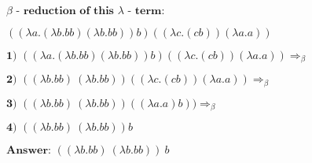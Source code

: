 \documentclass[a4paper,17pt]{extarticle}
\begin{document}
$\beta \textbf{ - reduction of this } \lambda \textbf{ - term:}$ \newline

$((\lambda a.(\lambda b.b b) (\lambda b.b b)) b) ((\lambda c.(c b)) (\lambda a.a))$ \newline

$\textbf{1) } ((\lambda a.(\lambda b.b b) (\lambda b.b b)) b) ((\lambda c.(c b)) (\lambda a.a)) \Longrightarrow_\beta $ \newline

$\textbf{2) } ((\lambda b.b b)\ (\lambda b.b b)) ((\lambda c.(c b)) (\lambda a.a)) \Longrightarrow_\beta $ \newline

$\textbf{3) } ((\lambda b.b b)\ (\lambda b.b b)) ((\lambda a.a) b)) \Longrightarrow_\beta $ \newline

$\textbf{4) } ((\lambda b.b b)\ (\lambda b.b b)) b$ \newline

$\textbf{Answer: } ((\lambda b.b b)\ (\lambda b.b b))\ b$ 
\end{document}
